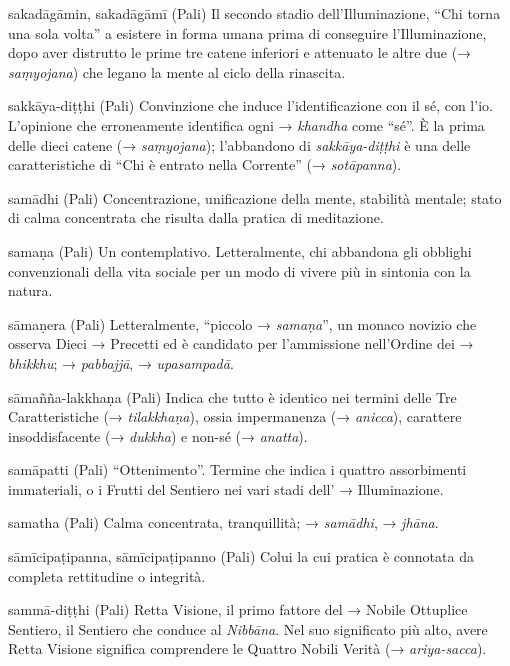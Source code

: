 \begin{glossarydescription}
\item[sakadāgāmin, sakadāgāmī] (Pali) Il secondo stadio
dell'Illuminazione, ``Chi torna una sola volta'' a esistere in forma
umana prima di conseguire l'Illuminazione, dopo aver distrutto le prime
tre catene inferiori e attenuato le altre due (→ \emph{saṃyojana}) che
legano la mente al ciclo della rinascita.

\item[sakkāya-diṭṭhi] (Pali) Convinzione che induce l'identificazione con il
sé, con l'io. L'opinione che erroneamente identifica ogni →
\emph{khandha} come ``sé''. È la prima delle dieci catene (→
\emph{saṃyojana}); l'abbandono di \emph{sakkāya-diṭṭhi} è una delle
caratteristiche di ``Chi è entrato nella Corrente'' (→
\emph{sotāpanna}).

\item[samādhi] (Pali) Concentrazione, unificazione della mente, stabilità
mentale; stato di calma concentrata che risulta dalla pratica di
meditazione.

\item[samaṇa] (Pali) Un contemplativo. Letteralmente, chi abbandona gli
obblighi convenzionali della vita sociale per un modo di vivere più in
sintonia con la natura.

\item[sāmaṇera] (Pali) Letteralmente, ``piccolo → \emph{samaṇa}'', un monaco
novizio che osserva Dieci → Precetti ed è candidato per l'ammissione
nell'Ordine dei → \emph{bhikkhu}; → \emph{pabbajjā}, →
\emph{upasampadā}.

\item[sāmañña-lakkhaṇa] (Pali) Indica che tutto è identico nei termini delle
Tre Caratteristiche (→ \emph{tilakkhaṇa}), ossia impermanenza (→
\emph{anicca}), carattere insoddisfacente (→ \emph{dukkha}) e non-sé (→
\emph{anatta}).

\item[samāpatti] (Pali) ``Ottenimento''. Termine che indica i quattro
assorbimenti immateriali, o i Frutti del Sentiero nei vari stadi dell' →
Illuminazione.

\item[samatha] (Pali) Calma concentrata, tranquillità; → \emph{samādhi}, →
\emph{jhāna}.

\item[sāmīcipaṭipanna, sāmīcipaṭipanno] (Pali) Colui la cui pratica è
connotata da completa rettitudine o integrità.

\item[sammā-diṭṭhi] (Pali) Retta Visione, il primo fattore del → Nobile
Ottuplice Sentiero, il Sentiero che conduce al \emph{Nibbāna}. Nel suo
significato più alto, avere Retta Visione significa comprendere le
Quattro Nobili Verità (→ \emph{ariya-sacca}).


\end{glossarydescription}
